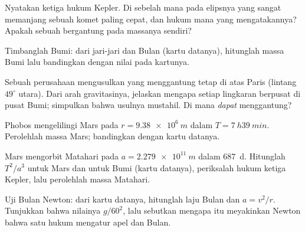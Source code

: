 \begin{exercise}[$\star$]\label{exo:g12:satellites-kepler:5}
Nyatakan ketiga hukum Kepler. Di sebelah mana pada elipsnya yang sangat
memanjang sebuah komet paling cepat, dan hukum mana yang mengatakannya?
Apakah  sebuah  bergantung pada massanya sendiri?
\end{exercise}

\begin{exercise}[$\star\star$]\label{exo:g12:satellites-kepler:6}
Timbanglah Bumi: dari jari-jari  dan  Bulan (kartu datanya),
hitunglah massa Bumi lalu bandingkan dengan nilai pada kartunya.
\end{exercise}

\begin{exercise}[$\star\star$]\label{exo:g12:satellites-kepler:7}
Sebuah perusahaan mengusulkan  yang menggantung tetap di atas Paris
(lintang $49^\circ$ utara). Dari arah gravitasinya, jelaskan mengapa setiap
 lingkaran berpusat di pusat Bumi; simpulkan bahwa usulnya mustahil. Di
mana  \emph{dapat} menggantung?
\end{exercise}

\begin{exercise}[$\star\star$]\label{exo:g12:satellites-kepler:8}
Phobos mengelilingi Mars pada $r = \qty{9.38e6}{m}$ dalam $T = \qty{7}{h}
\qty{39}{min}$. Perolehlah massa Mars; bandingkan dengan kartu datanya.
\end{exercise}

\begin{exercise}[$\star\star$]\label{exo:g12:satellites-kepler:9}
Mars mengorbit Matahari pada $a = \qty{2.279e11}{m}$ dalam \qty{687}{d}.
Hitunglah $T^2/a^3$ untuk Mars dan untuk Bumi (kartu datanya), periksalah
hukum ketiga Kepler, lalu perolehlah massa Matahari.
\end{exercise}

\begin{exercise}[$\star\star$]\label{exo:g12:satellites-kepler:10}
Uji Bulan Newton: dari kartu datanya, hitunglah laju Bulan dan  $a = v^2/r$. Tunjukkan bahwa nilainya $g/60^2$, lalu sebutkan
mengapa itu meyakinkan Newton bahwa satu hukum mengatur apel dan Bulan.
\end{exercise}

